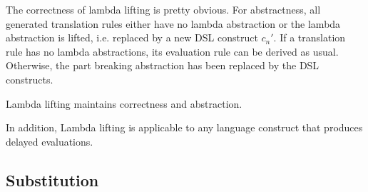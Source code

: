 The correctness of lambda lifting is pretty obvious.
For abstractness, all generated translation rules either have no lambda abstraction or the lambda abstraction is lifted, i.e. replaced by a new DSL construct $c_n'$.
If a translation rule has no lambda abstractions, its evaluation rule can be derived as usual.
Otherwise, the part breaking abstraction has been replaced by the DSL constructs.

\begin{theorem}
  Lambda lifting maintains correctness and abstraction.
\end{theorem}

In addition, Lambda lifting is applicable to any language construct that produces delayed evaluations.

\subsection{Substitution}

